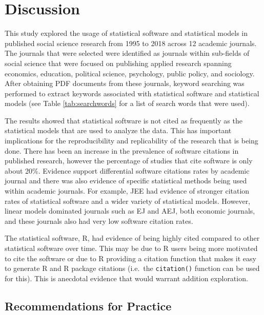 \documentclass[english,,man]{apa6}
\begin{document}
\hypertarget{discussion}{%
\section{Discussion}\label{discussion}}

This study explored the usage of statistical software and statistical models in published social science research from 1995 to 2018 across 12 academic journals. The journals that were selected were identified as journals within sub-fields of social science that were focused on publishing applied research spanning economics, education, political science, psychology, public policy, and sociology. After obtaining PDF documents from these journals, keyword searching was performed to extract keywords associated with statistical software and statistical models (see Table \ref{tab:searchwords} for a list of search words that were used).

The results showed that statistical software is not cited as frequently as the statistical models that are used to analyze the data. This has important implications for the reproducibility and replicability of the research that is being done. There has been an increase in the prevalence of software citations in published research, however the percentage of studies that cite software is only about 20\%. Evidence support differential software citations rates by academic journal and there was also evidence of specific statistical methods being used within academic journals. For example, JEE had evidence of stronger citation rates of statistical software and a wider variety of statistical models. However, linear models dominated journals such as EJ and AEJ, both economic journals, and these journals also had very low software citation rates.

The statistical software, R, had evidence of being highly cited compared to other statistical software over time. This may be due to R users being more motivated to cite the software or due to R providing a citation function that makes it easy to generate R and R package citations (i.e.~the \texttt{citation()} function can be used for this). This is anecdotal evidence that would warrant addition exploration.

\hypertarget{recommendations-for-practice}{%
\subsection{Recommendations for Practice}\label{recommendations-for-practice}}
\end{document}
